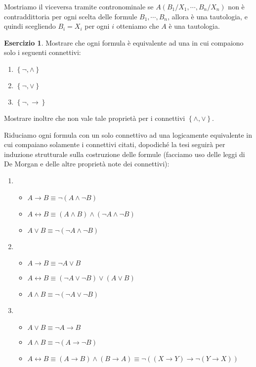 \documentclass[a4paper]{article}
\newcommand{\limplies}{\rightarrow}
\newcommand{\liff}{\leftrightarrow}
\theoremstyle{definition}
\theoremstyle{definition}
\theoremstyle{remark}
\theoremstyle{definition}
\newtheorem{exercise}{Esercizio}[section]
\begin{document}
Mostriamo il viceversa tramite contronominale se $A\left( B_1\slash X_1,\cdots, B_n\slash X_n \right)$ non è
contraddittoria per ogni scelta delle formule $B_1,\cdots,B_n$, allora è una tautologia, e quindi scegliendo $B_i=X_i$ per ogni $i$ otteniamo che $A$ è una tautologia.
\setcounter{exercise}{28}
\begin{exercise}\label{equivalenze}
	Mostrare che ogni formula è equivalente ad una in cui compaiono solo i seguenti connettivi:
	\begin{enumerate}
		\item $\left\{ \lnot,\land \right\}$
		\item $\left\{ \lnot,\lor \right\}$
		\item $\left\{ \lnot,\limplies \right\}$
	\end{enumerate}
	Mostrare inoltre che non vale tale proprietà per i connettivi $\left\{ \land,\lor \right\}$.
\end{exercise}
\noindent
Riduciamo ogni formula con un solo connettivo ad una logicamente equivalente in cui compaiano solamente i connettivi citati, dopodiché la tesi seguirà per induzione strutturale sulla
costruzione delle formule (facciamo uso delle leggi di De Morgan e delle altre proprietà note dei connettivi):
\begin{enumerate}
	\item
		\begin{itemize}
			\item $A\limplies B\equiv\lnot\left( A\land\lnot B \right)$
			\item $A\liff B\equiv \left( A\land B \right) \land \left( \lnot A \land\lnot B \right) $
			\item $A\lor B\equiv\lnot\left( \lnot A \land \lnot B \right) $
		\end{itemize}
	\item
		\begin{itemize}
			\item $A\limplies B\equiv\lnot A\lor B$
			\item $A\liff B\equiv \left( \lnot A\lor \lnot B \right) \lor \left( A \lor B \right) $
			\item $A\land B\equiv\lnot\left( \lnot A \lor\lnot B \right) $
		\end{itemize}
	\item
		\begin{itemize}
			\item $A\lor B\equiv\lnot A\limplies B$
			\item $A\land B\equiv \lnot\left( A\limplies \lnot B \right) $
			\item $A\liff B\equiv \left( A\limplies B \right) \land \left( B \limplies A \right) \equiv \lnot\left( \left( X \limplies Y \right) \limplies \lnot\left(
				Y\limplies X \right)  \right) $
		\end{itemize}
\end{enumerate}
\end{document}

